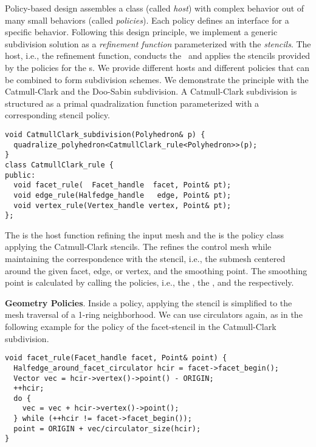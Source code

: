
Policy-based design \cite{Alexandrescu:2001:MCD} assembles a class
(called \emph{host}) with complex behavior out of many small behaviors
(called \emph{policies}). Each policy defines an interface for a
specific behavior. Following this design principle, we implement a
generic subdivision solution as a \emph{refinement function\/}
parameterized with the \emph{stencils}. The host, i.e., the refinement
function, conducts the \tr\ and applies the stencils provided by the
policies for the \gm s. We provide different hosts and different
policies that can be combined to form subdivision schemes.  We
demonstrate the principle with the Catmull-Clark and the Doo-Sabin
subdivision. A Catmull-Clark subdivision is structured as a
primal quadralization function parameterized with a corresponding
stencil policy.
\begin{lstlisting}
void CatmullClark_subdivision(Polyhedron& p) {
  quadralize_polyhedron<CatmullClark_rule<Polyhedron>>(p);
}
class CatmullClark_rule {
public:
  void facet_rule(  Facet_handle  facet, Point& pt);
  void edge_rule(Halfedge_handle   edge, Point& pt);
  void vertex_rule(Vertex_handle vertex, Point& pt);
};
\end{lstlisting}\vspace*{-3mm}

\noindent
The  is the host function
refining the input mesh
and the  is the policy class applying the
Catmull-Clark stencils. The  
refines the control mesh while maintaining the 
correspondence with the stencil, i.e., the submesh centered 
around the given facet, edge, or
vertex, and the smoothing point. The smoothing point
is calculated by calling the policies, i.e.,
the , the ,
and the  respectively.

\noindent\textbf{Geometry Policies}.
Inside a policy, applying the stencil is simplified to
the mesh traversal of a 1-ring neighborhood. We can use circulators
again, as in the following example for the policy of the facet-stencil 
in the Catmull-Clark subdivision.
\begin{lstlisting}
void facet_rule(Facet_handle facet, Point& point) {
  Halfedge_around_facet_circulator hcir = facet->facet_begin();
  Vector vec = hcir->vertex()->point() - ORIGIN;
  ++hcir;
  do {
    vec = vec + hcir->vertex()->point();
  } while (++hcir != facet->facet_begin());
  point = ORIGIN + vec/circulator_size(hcir);
}
\end{lstlisting}\vspace*{-3mm}

